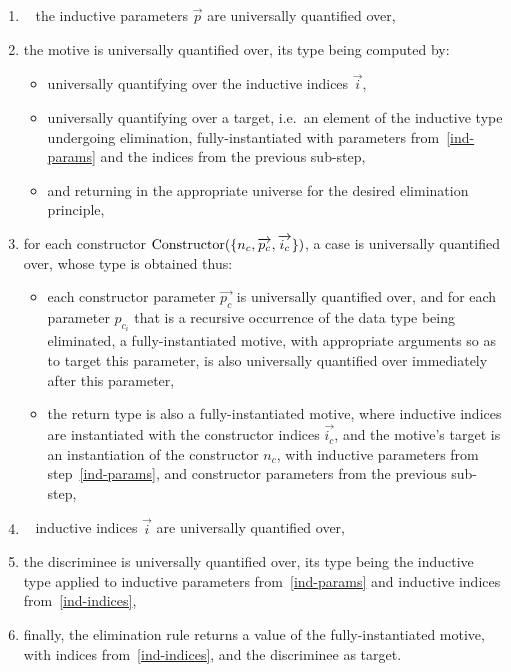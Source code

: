 \begin{enumerate}[label=\protect\circled{\arabic*}]

\item~\label{ind-params} the inductive parameters $\overrightarrow{p}$ are
universally quantified over,

\item the motive  is universally quantified over, its type being
computed by:

\begin{itemize}

\item universally quantifying over the inductive indices $\overrightarrow{i}$,

\item universally quantifying over a target, i.e.\ an element of the inductive
type undergoing elimination, fully-instantiated with parameters
from~\ref{ind-params} and the indices from the previous sub-step,

\item and returning in the appropriate universe for the desired elimination
principle,

\end{itemize}

\item for each constructor
$\text{Constructor}(\{ n_c, \overrightarrow{p_c}, \overrightarrow{i_c} \})$, a case is
universally quantified over, whose type is obtained thus:

\begin{itemize}

\item each constructor parameter $\overrightarrow{p_c}$ is
universally quantified over, and for each parameter $p_{c_i}$ that is a
recursive occurrence of the data type being eliminated, a fully-instantiated
motive, with appropriate arguments so as to target this parameter, is also
universally quantified over immediately after this parameter,

\item the return type is also a fully-instantiated motive, where inductive
indices are instantiated with the constructor indices $\overrightarrow{i_c}$,
and the motive's target is an instantiation of the constructor $n_c$, with
inductive parameters from step~\ref{ind-params}, and constructor parameters from
the previous sub-step,

\end{itemize}

\item~\label{ind-indices} inductive indices $\overrightarrow{i}$ are
universally quantified over,

\item the discriminee is universally quantified over, its type being the
inductive type applied to inductive parameters from~\ref{ind-params} and
inductive indices from~\ref{ind-indices},

\item finally, the elimination rule returns a value of the fully-instantiated
motive, with indices from~\ref{ind-indices}, and the discriminee as target.

\end{enumerate}
